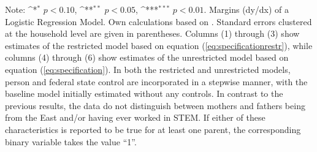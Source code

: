 \documentclass[a4paper, oneside, hyperfootnotes = false]{article}
\def\sym#1{\ifmmode^{#1}\else\(^{#1}\)\fi}
\begin{document}
{\begin{landscape}
\begin{table}[ht]
\begin{center}
			\vspace{2mm}
			
			\parbox{15cm}{
				\linespread{1}\footnotesize Note: \sym{*} \(p<0.10\), \sym{**} \(p<0.05\), \sym{***} \(p<0.01\). Margins (dy/dx) of a Logistic Regression Model. Own calculations based on \cite{SOEP2023}. Standard errors clustered at the household level are given in parentheses. Columns (1) through (3) show estimates of the restricted model based on equation (\ref{eq:specificationrestr}), while columns (4) through (6) show estimates of the unrestricted model based on equation (\ref{eq:specification}). In both the restricted and unrestricted models, person and federal state control are incorporated in a stepwise manner, with the baseline model initially estimated without any controls. In contrast to the previous results, the data do not distinguish between mothers and fathers being from the East and/or having ever worked in STEM. If either of these characteristics is reported to be true for at least one parent, the corresponding binary variable takes the value ``1''.}
			
		\end{center}
	\end{table}
\end{landscape}

}
\end{document}
